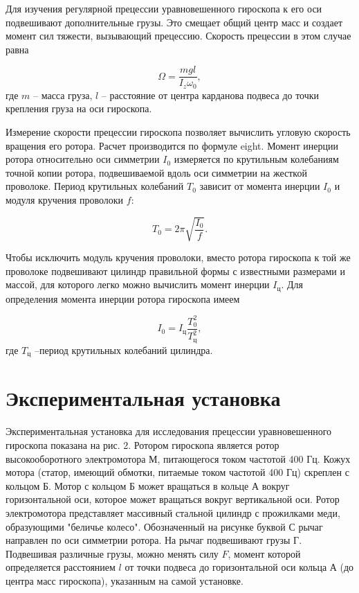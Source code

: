 \documentclass[12pt, a4paper]{article}
\begin{document}
Для изучения регулярной прецессии уравновешенного гироскопа к его оси подвешивают дополнительные грузы. Это смещает общий центр масс и создает момент сил тяжести, вызывающий прецессию. Скорость прецессии в этом случае равна

\begin{equation}
\Omega = \frac{mgl}{I_z\omega_0},
\label{eight}
\end{equation}
где $ m $ -- масса груза, $ l $ -- расстояние от центра карданова подвеса до точки крепления груза на оси гироскопа.

Измерение скорости прецессии гироскопа позволяет вычислить угловую скорость вращения его ротора. Расчет производится по формуле {eight}. Момент инерции ротора относительно оси симметрии $ I_0 $ измеряется по крутильным колебаниям точной копии ротора, подвешиваемой вдоль оси симметрии на жесткой проволоке. Период крутильных колебаний $ T_0 $ зависит от момента инерции $ I_0 $ и модуля кручения проволоки $ f $:

\begin{equation}
T_0 = 2\pi\sqrt{\frac{I_0}{f}}.
\label{nine}
\end{equation} 

Чтобы исключить модуль кручения проволоки, вместо ротора гироскопа к той же проволоке подвешивают цилиндр правильной формы с известными размерами и массой, для которого легко можно вычислить момент инерции $ I_\text{ц} $. Для определения момента инерции ротора гироскопа имеем 

\begin{equation}
I_0=I_\text{ц}\frac{T_0^2}{T_\text{ц}^2},
\label{ten}
\end{equation}
где $ T_\text{ц} $ --период крутильных колебаний цилиндра.


\section{Экспериментальная установка}

Экспериментальная установка для исследования прецессии уравновешенного гироскопа показана на рис. 2.
Ротором гироскопа является ротор высокооборотного электромотора М, питающегося током частотой 400 Гц.
Кожух мотора (статор, имеющий обмотки, питаемые током частотой 400 Гц) скреплен с кольцом Б.
Мотор с кольцом Б может вращаться в кольце А вокруг горизонтальной оси, которое может вращаться вокруг вертикальной оси.
Ротор электромотора представляет массивный стальной цилиндр с прожилками меди, образующими "беличье колесо".
Обозначенный на рисунке буквой С рычаг направлен по оси симметрии ротора. На рычаг подвешивают грузы Г.
Подвешивая различные грузы, можно менять силу $F$, момент которой определяется расстоянием $l$ от точки подвеса до горизонтальной оси кольца А
(до центра масс гироскопа), указанным на самой установке.
\end{document}
